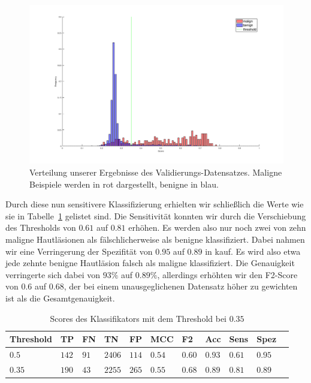 \begin{figure}[htb!]
	\begin{center}
		\includegraphics[width=\textwidth]{./pics/threshold/score_threshold.png}
		\caption{Verteilung unserer Ergebnisse des Validierungs-Datensatzes. Maligne Beispiele werden in rot dargestellt, benigne in blau.}
		\label{fig:verteilung}
    \end{center}
\end{figure}


Durch diese nun sensitivere Klassifizierung erhielten wir schließlich die Werte wie sie in Tabelle~\ref{tab:final_scores} gelistet sind. Die Sensitivität konnten wir durch die Verschiebung des Thresholds von $0.61$ auf $0.81$ erhöhen. Es werden also nur noch zwei von zehn maligne Hautläsionen als fälschlicherweise als benigne klassifiziert. Dabei nahmen wir eine Verringerung der Spezifität von $0.95$ auf $0.89$ in kauf. Es wird also etwa jede zehnte benigne Hautläsion falsch als maligne klassifiziert. Die Genauigkeit verringerte sich dabei von $93\%$ auf $0.89\%$, allerdings erhöhten wir den F2-Score von $0.6$ auf $0.68$, der bei einem unausgeglichenen Datensatz höher zu gewichten ist als die Gesamtgenauigkeit.

\begin{table}[htb!]
\begin{center}
\begin{tabular}{lllllllllll}
	\toprule
 	Threshold  & TP & FN & TN & FP & MCC & F2 & Acc & Sens & Spez\\
	\midrule
    $0.5$ & $142$&	$91$ &	$2406$ &	$114$ &	$0.54$ 	&$0.60$	&$0.93$	&$0.61$&	$0.95$ \\
	$0.35$ & $190$ & $43$ &	$2255$ &	$265$ &	$0.55$ &	$0.68$&	$0.89$ &	$0.81$ & $0.89$\\
 \bottomrule
 \end{tabular}
 \end{center}
  \caption{Scores des Klassifikators mit dem Threshold bei $0.35$}
 \label{tab:final_scores}
 \end{table}

